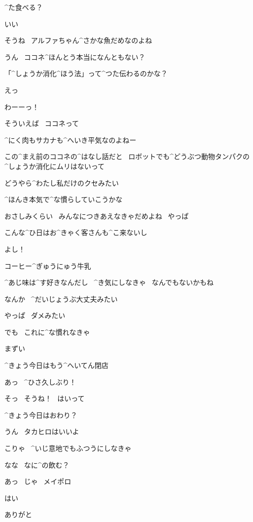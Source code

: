 \Kokone ^{た}{食}べる？

\Alpha いい

\Kokone そうね
\ アルファちゃん^{さかな}{魚}だめなのよね

\Alpha うん
\ ココネ^{ほんとう}{本当}になんともない？

\Kokone 「^{しょうか}{消化}^{ほう}{法}」って^{つた}{伝}わるのかな？

\Alpha えっ

\Alpha わーーっ！

\page[55]
\Alpha そういえば
\ ココネって

\Alpha ^{にく}{肉}もサカナも^{へいき}{平気}なのよねー

\Alpha この^{まえ}{前}のココネの^{はなし}{話}だと
\ ロボットでも^{どうぶつ}{動物}タンパクの^{しょうか}{消化}にムリはないって

\Alpha どうやら^{わたし}{私}だけのクセみたい

\page[56]
\Alpha ^{ほんき}{本気}で^{な}{慣}らしていこうかな

\Alpha おさしみくらい
\ みんなにつきあえなきゃだめよね
\ やっぱ

\Alpha こんな^{ひ}{日}はお^{きゃく}{客}さんも^{こ}{来}ないし

\Alpha よし！

\page[57]
\Sign コーヒー^{ぎゅうにゅう}{牛乳}

\Alpha ^{あじ}{味}は^{す}{好}きなんだし
\ ^{き}{気}にしなきゃ
\ なんでもないかもね

\page[58]
\Alpha なんか
\ ^{だいじょうぶ}{大丈夫}みたい

\page[59]
\Alpha やっぱ
\ ダメみたい

\Alpha でも
\ これに^{な}{慣}れなきゃ

\Alpha まずい

\Alpha ^{きょう}{今日}はもう^{へいてん}{閉店}

\page[60]
\Takahiro あっ
\ ^{ひさ}{久}しぶり！

\Alpha そっ
\ そうね！
\ はいって

\Takahiro ^{きょう}{今日}はおわり？

\Alpha うん
\ タカヒロはいいよ

\page[61]
\Alpha こりゃ
\ ^{いじ}{意地}でもふつうにしなきゃ

\Alpha なな
\ なに^{の}{飲}む？

\Takahiro あっ
\ じゃ
\ メイポロ

\Alpha はい

\Takahiro ありがと


